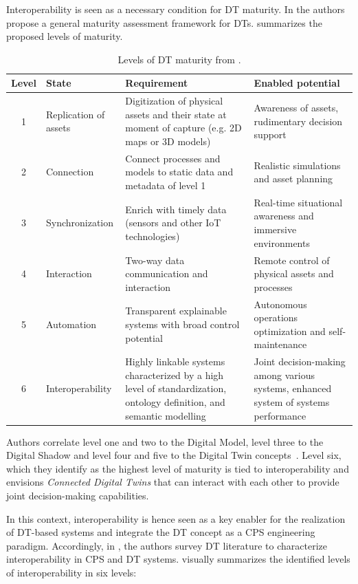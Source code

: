 Interoperability is seen as a necessary condition for \ac{DT} maturity.
In \cite{Klar_Arvidsson_Angelakis_2024} the authors propose a general maturity assessment framework for \acp{DT}. 
 summarizes the proposed levels of maturity.


\begin{table}[htbp]
\centering
\renewcommand{\arraystretch}{1.2}
\begin{tabular}{c|p{2.8cm}|p{5cm}|p{4cm}}
\toprule
\midrule
\textbf{Level} & \textbf{State} & \textbf{Requirement} & \textbf{Enabled potential} \\
\midrule
\toprule
1 & Replication of assets & 
Digitization of physical assets and their state at moment of capture (e.g. 2D maps or 3D models) & 
Awareness of assets, rudimentary decision support \\
\hline
2 & Connection & 
Connect processes and models to static data and metadata of level 1 & 
Realistic simulations and asset planning \\
\hline
3 & Synchronization & 
Enrich with timely data (sensors and other IoT technologies) & 
Real-time situational awareness and immersive environments \\
\hline
4 & Interaction & 
Two-way data communication and interaction & 
Remote control of physical assets and processes \\
\hline
5 & Automation & 
Transparent explainable systems with broad control potential & 
Autonomous operations optimization and self-maintenance \\
\hline
6 & Interoperability & 
Highly linkable systems characterized by a high level of standardization, ontology definition, and semantic modelling & 
Joint decision-making among various systems, enhanced system of systems performance \\
\midrule
\bottomrule
\end{tabular}
\caption{Levels of \acl{DT} maturity from \cite{Klar_Arvidsson_Angelakis_2024}.}
\label{tab:dt-maturity}
\end{table}

Authors correlate level one and two to the Digital Model, level three to the Digital Shadow and level four and five to the Digital Twin concepts~\cite{kritzinger2018dtmanufacturing}.
%
Level six, which they identify as the highest level of maturity is tied to interoperability and envisions \emph{Connected Digital Twins} that can interact with each other to provide joint decision-making capabilities. 

In this context, interoperability is hence seen as a key enabler for the realization of \ac{DT}-based systems and integrate the \ac{DT} concept as a \ac{CPS} engineering paradigm. 
%
Accordingly, in \cite{Acharya_Khan_Päivärinta_2024}, the authors survey \ac{DT} literature to characterize interoperability in \ac{CPS} and \ac{DT} systems.
%
 visually summarizes the identified levels of interoperability in six levels: 

